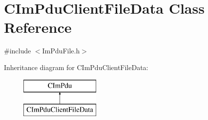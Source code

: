 \hypertarget{class_c_im_pdu_client_file_data}{}\section{C\+Im\+Pdu\+Client\+File\+Data Class Reference}
\label{class_c_im_pdu_client_file_data}


{\ttfamily \#include $<$Im\+Pdu\+File.\+h$>$}

Inheritance diagram for C\+Im\+Pdu\+Client\+File\+Data\+:\begin{figure}[H]
\begin{center}
\leavevmode
\includegraphics[height=2.000000cm]{class_c_im_pdu_client_file_data}
\end{center}
\end{figure}
